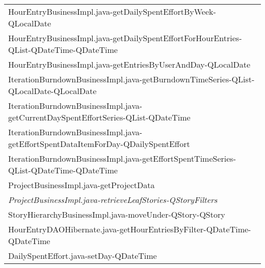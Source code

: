 \begin{table}[t!]
\begin{tabular}{l}
     HourEntryBusinessImpl.java-getDailySpentEffortByWeek-QLocalDate                                            \\%
     HourEntryBusinessImpl.java-getDailySpentEffortForHourEntries-QList-QDateTime-QDateTime          \\%
     HourEntryBusinessImpl.java-getEntriesByUserAndDay-QLocalDate                                               \\%
     IterationBurndownBusinessImpl.java-getBurndownTimeSeries-QList-QLocalDate-QLocalDate \\%
     IterationBurndownBusinessImpl.java-getCurrentDaySpentEffortSeries-QList-QDateTime                \\%
     IterationBurndownBusinessImpl.java-getEffortSpentDataItemForDay-QDailySpentEffort                                \\%
     IterationBurndownBusinessImpl.java-getEffortSpentTimeSeries-QList-QDateTime-QDateTime           \\%
     ProjectBusinessImpl.java-getProjectData                                                                         \\%
     \emph{ProjectBusinessImpl.java-retrieveLeafStories-QStoryFilters}                                                     \\%
     StoryHierarchyBusinessImpl.java-moveUnder-QStory-QStory                                                         \\%
     HourEntryDAOHibernate.java-getHourEntriesByFilter-QDateTime-QDateTime                                         \\%
     DailySpentEffort.java-setDay-QDateTime                                                                                \\%

\end{tabular}
\end{table}
